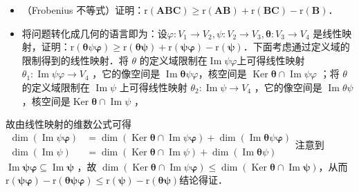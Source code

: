 \documentclass[14pt]{beamer}
\begin{document}
\begin{frame}
\begin{itemize}
\item<1-> （Frobenius 不等式）证明：$  \mathrm{r}(\boldsymbol{A} \boldsymbol{B} \boldsymbol{C}) \geq \mathrm{r}(\boldsymbol{A} \boldsymbol{B})+\mathrm{r}(\boldsymbol{B C})-\mathrm{r}(\boldsymbol{B})  $．
\item<2-> 将问题转化成几何的语言即为：设$  \varphi: V_{1} \rightarrow V_{2}, \psi: V_{2} \rightarrow   V_{3}, \boldsymbol{\theta}: V_{3} \rightarrow V_{4} $ 是线性映射，证明：$  \mathrm{r}(\boldsymbol{\theta} \psi \boldsymbol{\varphi}) \geq \mathrm{r}(\boldsymbol{\theta} \boldsymbol{\psi})+\mathrm{r}(\boldsymbol{\psi} \boldsymbol{\varphi})-\mathrm{r}(\boldsymbol{\psi})  $．下面考虑通过定义域的限制得到的线性映射．将 $ \theta $ 的定义域限制在$  \operatorname{Im} \psi \varphi  $上可得线性映射 $ \theta_{1}: \operatorname{Im} \psi \varphi \rightarrow V_{4} $ ，它的像空间是  $\operatorname{Im} \boldsymbol{\theta} \psi \varphi  $，核空间是  $\operatorname{Ker} \boldsymbol{\theta} \cap \operatorname{Im} \psi \varphi $ ；将 $ \theta  $的定义域限制在 $ \operatorname{Im} \psi $ 上可得线性映射 $ \theta_{2}: \operatorname{Im} \psi \rightarrow V_{4} $ ，它的像空间是 $ \operatorname{Im} \theta \psi  $，核空间是$  \operatorname{Ker} \boldsymbol{\theta} \cap \operatorname{Im} \psi $ ，
\end{itemize}
\end{frame}

\begin{frame}
	故由线性映射的维数公式可得$\begin{aligned}\operatorname{dim}(\operatorname{Im} \psi \boldsymbol{\varphi}) & =\operatorname{dim}(\operatorname{Ker} \boldsymbol{\theta} \cap \operatorname{Im} \psi \boldsymbol{\varphi})+\operatorname{dim}(\operatorname{Im} \boldsymbol{\theta} \psi \boldsymbol{\varphi}) \\\operatorname{dim}(\operatorname{Im} \psi) & =\operatorname{dim}(\operatorname{Ker} \boldsymbol{\theta} \cap \operatorname{Im} \psi)+\operatorname{dim}(\operatorname{Im} \boldsymbol{\theta} \psi)\end{aligned}$注意到$  \operatorname{Im} \boldsymbol{\psi} \boldsymbol{\varphi} \subseteq \operatorname{Im} \boldsymbol{\psi} $ ，故 $ \operatorname{dim}(\operatorname{Ker} \boldsymbol{\theta} \cap \operatorname{Im} \psi \boldsymbol{\varphi}) \leq \operatorname{dim}(\operatorname{Ker} \boldsymbol{\theta} \cap \operatorname{Im} \boldsymbol{\psi})  $，从而$\mathrm{r}(\boldsymbol{\psi} \boldsymbol{\varphi})-\mathrm{r}(\boldsymbol{\theta} \boldsymbol{\psi} \boldsymbol{\varphi}) \leq \mathrm{r}(\boldsymbol{\psi})-\mathrm{r}(\boldsymbol{\theta} \boldsymbol{\psi})$结论得证．
\end{frame}
\end{document}
